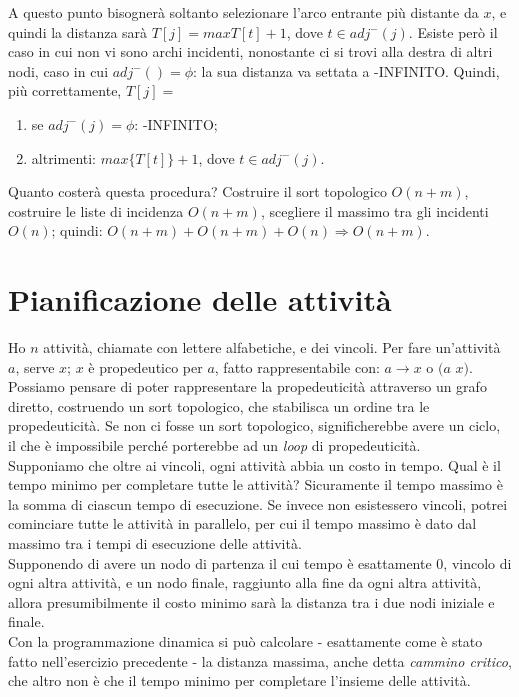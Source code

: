 A questo punto bisognerà soltanto selezionare l'arco entrante più distante da $x$, e quindi la distanza sarà $T[j] = max{T[t]} + 1$, dove $t \in adj^-(j)$. Esiste però il caso in cui non vi sono archi incidenti, nonostante ci si trovi alla destra di altri nodi, caso in cui $adj^-() = \phi$: la sua distanza va settata a -INFINITO. Quindi, più correttamente, $T[j] =$
\begin{enumerate}
	\item se $adj^-(j) = \phi$: -INFINITO;
	\item altrimenti: $max\{T[t]\} + 1$, dove $t \in adj^-(j)$.
\end{enumerate}
Quanto costerà questa procedura? Costruire il sort topologico $O(n+m)$, costruire le liste di incidenza $O(n+m)$, scegliere il massimo tra gli incidenti $O(n)$; quindi: $O(n+m) + O(n+m) + O(n) \Rightarrow O(n+m)$.

\section{Pianificazione delle attività}
Ho $n$ attività, chiamate con lettere alfabetiche, e dei vincoli. Per fare un'attività $a$, serve $x$; $x$ è propedeutico per $a$, fatto rappresentabile con: $a \to x$ o $(a$ $x)$. Possiamo pensare di poter rappresentare la propedeuticità attraverso un grafo diretto, costruendo un sort topologico, che stabilisca un ordine tra le propedeuticità. Se non ci fosse un sort topologico, significherebbe avere un ciclo, il che è impossibile perché porterebbe ad un \textit{loop} di propedeuticità. \\
Supponiamo che oltre ai vincoli, ogni attività abbia un costo in tempo. Qual è il tempo minimo per completare tutte le attività? Sicuramente il tempo massimo è la somma di ciascun tempo di esecuzione. Se invece non esistessero vincoli, potrei cominciare tutte le attività in parallelo, per cui il tempo massimo è dato dal massimo tra i tempi di esecuzione delle attività. \\
Supponendo di avere un nodo di partenza il cui tempo è esattamente 0, vincolo di ogni altra attività, e un nodo finale, raggiunto alla fine da ogni altra attività, allora presumibilmente il costo minimo sarà la distanza tra i due nodi iniziale e finale. \\
Con la programmazione dinamica si può calcolare - esattamente come è stato fatto nell'esercizio precedente - la distanza massima, anche detta \textit{cammino critico}, che altro non è che il tempo minimo per completare l'insieme delle attività. \\


